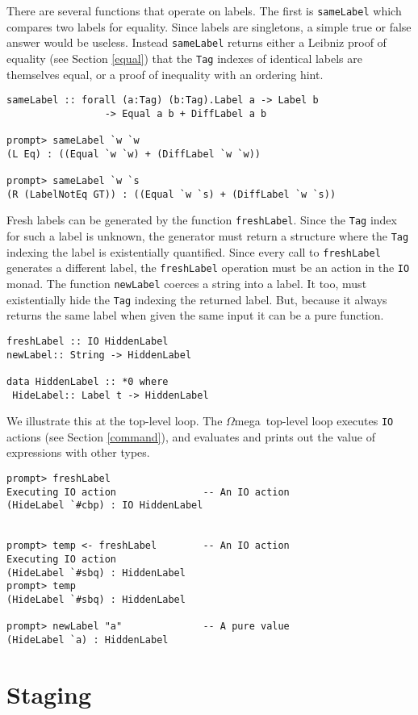 \documentclass[11pt,twoside]{article}
\newcommand{\om}{$\Omega$mega}
\begin{document}
There are several functions that operate on labels. The first is
{\tt sameLabel} which compares two labels for equality. Since labels
are singletons, a simple true or false answer would be useless.
Instead {\tt sameLabel} returns either a Leibniz proof of equality
(see Section \ref{equal}) that the {\tt Tag}
indexes of identical labels are themselves equal, or a proof of
inequality with an ordering hint.
\begin{verbatim}
sameLabel :: forall (a:Tag) (b:Tag).Label a -> Label b
                 -> Equal a b + DiffLabel a b

prompt> sameLabel `w `w
(L Eq) : ((Equal `w `w) + (DiffLabel `w `w))

prompt> sameLabel `w `s
(R (LabelNotEq GT)) : ((Equal `w `s) + (DiffLabel `w `s))
\end{verbatim}

Fresh labels can be generated by the function {\tt freshLabel}.
Since the {\tt Tag} index for such a label is unknown, the generator
must return a structure where the
{\tt Tag} indexing the label is existentially quantified. Since every call
to {\tt freshLabel} generates a different label, the {\tt freshLabel}
operation must be an action in the {\tt IO} monad. The function
{\tt newLabel} coerces a string into a label. It too, must
existentially hide the {\tt Tag} indexing the returned label. But,
because it always returns the same label when given the same input
it can be a pure function.

\begin{verbatim}
freshLabel :: IO HiddenLabel
newLabel:: String -> HiddenLabel

data HiddenLabel :: *0 where
 HideLabel:: Label t -> HiddenLabel
\end{verbatim}
We illustrate this at the top-level loop. The \om\ top-level loop executes
{\tt IO} actions (see Section \ref{command}), and evaluates and prints
out the value of expressions with other types.
\begin{verbatim}
prompt> freshLabel
Executing IO action               -- An IO action
(HideLabel `#cbp) : IO HiddenLabel


prompt> temp <- freshLabel        -- An IO action
Executing IO action
(HideLabel `#sbq) : HiddenLabel
prompt> temp
(HideLabel `#sbq) : HiddenLabel

prompt> newLabel "a"              -- A pure value
(HideLabel `a) : HiddenLabel
\end{verbatim}

\section{Staging}
\end{document}
